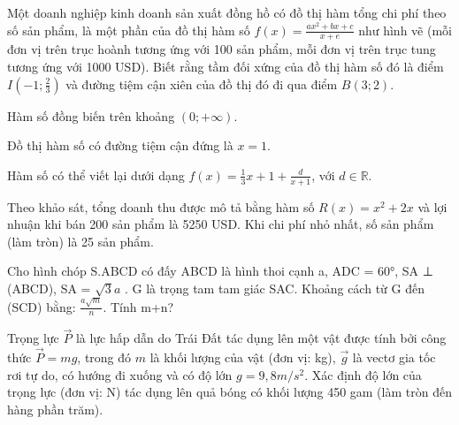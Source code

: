 \begin{question}[type=true_false,difficulty=4,code={II-4}]
Một doanh nghiệp kinh doanh sản xuất đồng hồ có đồ thị hàm tổng chi phí theo số sản phẩm, là một phần của đồ thị hàm số $ f(x)=\frac{ax^2+bx+c}{x+e} $ như hình vẽ (mỗi đơn vị trên trục hoành tương ứng với 100 sản phẩm, mỗi đơn vị trên trục tung tương ứng với 1000 USD). Biết rằng tầm đối xứng của đồ thị hàm số đó là điểm $ I\left(-1;\frac{2}{3}\right) $ và đường tiệm cận xiên của đồ thị đó đi qua điểm $ B(3;2) $.



\begin{statement}[correct=false,label=a]
Hàm số đồng biến trên khoảng $(0;+\infty)$.
\end{statement}

\begin{statement}[correct=false,label=b]
Đồ thị hàm số có đường tiệm cận đứng là $x = 1$.
\end{statement}

\begin{statement}[correct=true,label=c]
Hàm số có thể viết lại dưới dạng $f(x)=\frac{1}{3}x+1+\frac{d}{x+1}$, với $d \in \mathbb{R}$.
\end{statement}

\begin{statement}[correct=false,label=d]
Theo khảo sát, tổng doanh thu được mô tả bằng hàm số $R(x) = x^{2} + 2x$ và lợi nhuận khi bán 200 sản phẩm là 5250 USD. Khi chi phí nhỏ nhất, số sản phẩm (làm tròn) là 25 sản phẩm.
\end{statement}

\end{question}

\begin{question}[type=short_answer,difficulty=3,code={III-1}]
Cho hình chóp S.ABCD có đấy ABCD là hình thoi cạnh a, ADC = 60°, SA ⊥ (ABCD), SA = $ \sqrt{3}a $
. G là trọng tam tam giác SAC. Khoảng cách từ G đến (SCD) bằng: $ \frac{a\sqrt{m}}{n} $. Tính m+n?


\end{question}

\begin{question}[type=short_answer,difficulty=1,code={III-2}]
Trọng lực $\overrightarrow{P}$ là lực hấp dẫn do Trái Đất tác dụng lên một vật được tính bởi công thức $\overrightarrow{P}=mg$, trong đó $m$ là khối lượng của vật (đơn vị: kg), $\overrightarrow{g}$ là vectơ gia tốc rơi tự do, có hướng đi xuống và có độ lớn $g=9,8m/s^{2}$. Xác định độ lớn của trọng lực (đơn vị: N) tác dụng lên quả bóng có khối lượng 450 gam (làm tròn đến hàng phần trăm).


\end{question}

